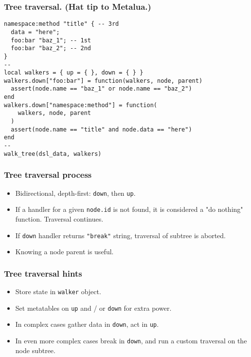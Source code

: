 \documentclass[handout]{beamer}
\begin{document}
\begin{frame}[fragile]

\frametitle{Tree traversal. (Hat tip to Metalua.)}

\begin{verbatim}
namespace:method "title" { -- 3rd
  data = "here";
  foo:bar "baz_1"; -- 1st
  foo:bar "baz_2"; -- 2nd
}
--
local walkers = { up = { }, down = { } }
walkers.down["foo:bar"] = function(walkers, node, parent)
  assert(node.name == "baz_1" or node.name == "baz_2")
end
walkers.down["namespace:method"] = function(
    walkers, node, parent
  )
  assert(node.name == "title" and node.data == "here")
end
--
walk_tree(dsl_data, walkers)
\end{verbatim}

\end{frame}


\begin{frame}[fragile]

\frametitle{Tree traversal process}

\begin{itemize}
\item Bidirectional, depth-first: \verb|down|, then \verb|up|.
\pause
\item If a handler for a given \verb|node.id| is not found,
      it is considered a "do nothing" function. Traversal continues.
\pause
\item If \verb|down| handler returns \verb|"break"| string,
      traversal of subtree is aborted.
\pause
\item Knowing a node parent is useful.
\end{itemize}

\end{frame}


\begin{frame}[fragile]

\frametitle{Tree traversal hints}

\begin{itemize}
\item Store state in \verb|walker| object.
\pause
\item Set metatables on \verb|up| and / or \verb|down| for extra power.
\pause
\item In complex cases gather data in \verb|down|, act in \verb|up|.
\pause
\item In even more complex cases break in \verb|down|, and run
      a custom traversal on the node subtree.
\end{itemize}

\end{frame}
\end{document}
